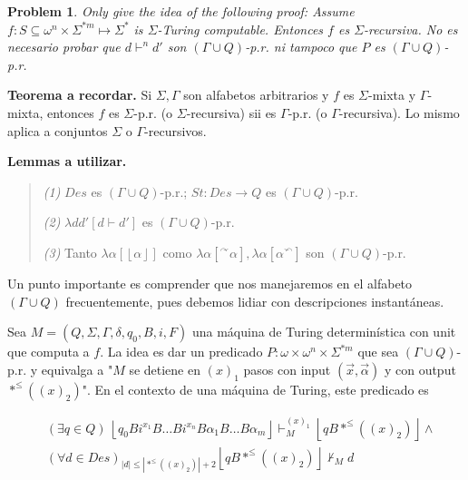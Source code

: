 \documentclass[a4paper, 12pt]{article}
\newtheorem{problem}{Problem}
\newtheorem{problem}{Problem}
\begin{document}
\pagebreak 

\begin{problem}
    Only give the idea of the following proof: Assume $f : S \subseteq
    \omega^{n} \times \Sigma^{*m}  \mapsto \Sigma^{*}$ is $\Sigma$-Turing
    computable. Entonces $f$ es $\Sigma$-recursiva.  No es necesario probar que
    $d \vdash^n d'$ son $(\Gamma \cup Q)$-p.r. ni tampoco que $P$ es
    $(\Gamma\cup Q)$-p.r.
\end{problem}

\textbf{Teorema a recordar.} Si $\Sigma, \Gamma$ son alfabetos arbitrarios y $f$
es $\Sigma$-mixta y $\Gamma$-mixta, entonces $f$ es $\Sigma$-p.r. (o
$\Sigma$-recursiva) sii es $\Gamma$-p.r. (o $\Gamma$-recursiva). Lo mismo aplica
a conjuntos $\Sigma$ o $\Gamma$-recursivos.

\textbf{Lemmas a utilizar.} 

\begin{quote}
    \textit{(1)} $Des$ es $(\Gamma\cup Q)$-p.r.; $St : Des \to Q$ es
    $(\Gamma \cup Q)$-p.r.  

    \textit{(2)} $\lambda dd' \left[ d \vdash d'  \right]$ es $(\Gamma \cup Q)$-p.r. 

    \textit{(3)} Tanto $\lambda \alpha \left[ \left\lfloor \alpha \right\rfloor
    \right]$ como $\lambda \alpha \left[ {}^{\curvearrowright}\alpha  \right],
    \lambda \alpha \left[ \alpha{}^{\curvearrowleft}  \right]$ son $(\Gamma \cup
    Q)$-p.r.
\end{quote}

Un punto importante es comprender que nos manejaremos en el alfabeto $(\Gamma
\cup Q)$ frecuentemente, pues debemos lidiar con descripciones instantáneas.

Sea $M = (Q, \Sigma, \Gamma, \delta, q_0, B, i, F)$ una máquina de Turing
determinística con unit que computa a $f$. La idea es dar un predicado $P :
\omega \times \omega^{n} \times \Sigma^{*m} $ que sea $(\Gamma
\cup Q)$-p.r. y equivalga a "$M$ se detiene en $(x)_1$ pasos con input $(\vec{x},
\vec{\alpha}) $ y con output $*^{\leq} \left( (x)_2 \right)  $". En el contexto de una
máquina de Turing, este predicado es 

\begin{align*}
    &(\exists q \in Q) ~ \left\lfloor q_0 B i^{x_1} B \ldots B i^{x_n} B
    \alpha_{1} B \ldots B \alpha_m \right\rfloor \vdash^{(x)_1}_{M} \left\lfloor
q B *^{\leq}( (x)_2 )\right\rfloor \land  \\ 
    &(\forall d \in Des)_{|d| \leq | *^{\leq}((x)_2) | + 2} \left\lfloor q B
    *^{\leq} ((x)_2) \right\rfloor \not\vdash_{M}  d
\end{align*}
\end{document}
